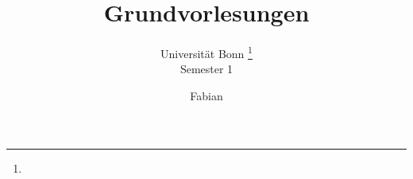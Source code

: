 \documentclass[a4paper, 10pt, oneside, openany,  bibliography=totocnumbered]{scrbook}
\begin{document}
\subject{Vorlesungsmitschriften}
\title{Grundvorlesungen}
\subtitle{
  Universität Bonn \footnote{
   \centering
  }
  \\
  Semester 1
}
\author{Fabian}
\publishers{
  Online aufrufbar auf \texttt{\url{https://github.com/git-fabus/lecutres/blob/main/notes.pdf}.}
  \\
 Veränderungsvorschläge und Verbesserungen bitte an 
}

\frontmatter
\maketitle

\tableofcontents

\mainmatter




\appendix %
%

\backmatter
%
\end{document}
